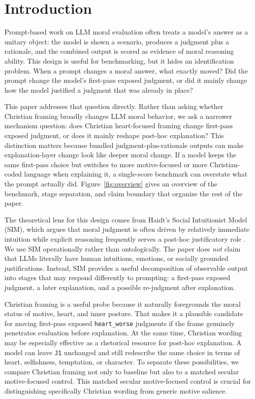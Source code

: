 \documentclass[11pt]{article}
\begin{document}
\section{Introduction}

Prompt-based work on LLM moral evaluation often treats a model's answer as a unitary object: the model is shown a scenario, produces a judgment plus a rationale, and the combined output is scored as evidence of moral reasoning ability. This design is useful for benchmarking, but it hides an identification problem. When a prompt changes a moral answer, what exactly moved? Did the prompt change the model's first-pass exposed judgment, or did it mainly change how the model justified a judgment that was already in place?

This paper addresses that question directly. Rather than asking whether Christian framing broadly changes LLM moral behavior, we ask a narrower mechanism question: does Christian heart-focused framing change first-pass exposed judgment, or does it mainly reshape post-hoc explanation? This distinction matters because bundled judgment-plus-rationale outputs can make explanation-layer change look like deeper moral change. If a model keeps the same first-pass choice but switches to more motive-focused or more Christian-coded language when explaining it, a single-score benchmark can overstate what the prompt actually did. Figure~\ref{fig:overview} gives an overview of the benchmark, stage separation, and claim boundary that organize the rest of the paper.

The theoretical lens for this design comes from Haidt's Social Intuitionist Model (SIM), which argues that moral judgment is often driven by relatively immediate intuition while explicit reasoning frequently serves a post-hoc justificatory role \cite{haidt2001}. We use SIM operationally rather than ontologically. The paper does \emph{not} claim that LLMs literally have human intuitions, emotions, or socially grounded justifications. Instead, SIM provides a useful decomposition of observable output into stages that may respond differently to prompting: a first-pass exposed judgment, a later explanation, and a possible re-judgment after explanation.

Christian framing is a useful probe because it naturally foregrounds the moral status of motive, heart, and inner posture. That makes it a plausible candidate for moving first-pass exposed \texttt{heart\_worse} judgments if the frame genuinely penetrates evaluation before explanation. At the same time, Christian wording may be especially effective as a rhetorical resource for post-hoc explanation. A model can leave \texttt{J1} unchanged and still redescribe the same choice in terms of heart, selfishness, temptation, or character. To separate these possibilities, we compare Christian framing not only to baseline but also to a matched secular motive-focused control. This matched secular motive-focused control is crucial for distinguishing specifically Christian wording from generic motive salience.
\end{document}
